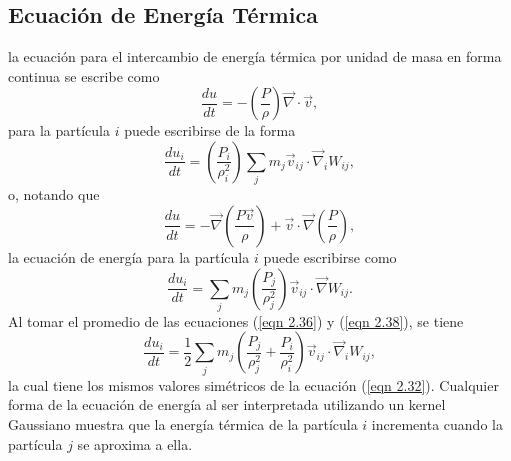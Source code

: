 \documentclass[a4paper,openright,12pt]{book}
\begin{document}
\subsection{Ecuación de Energía Térmica}
la ecuación para el intercambio de energía térmica por unidad de masa en forma continua se escribe como
\begin{equation}
\frac{d u}{d t}
=
-\left(\frac{P}{\rho}\right)
\vec{\nabla}\cdot\vec{v},\label{eqn 2.35}
\end{equation}
para la partícula $i$ puede escribirse de la forma
\begin{equation}
\frac{d u_{i}}{d t}
=
\left(\frac{P_{i}}{\rho_{i}^{2}}\right)
\sum_{j}m_{j}\vec{v}_{ij}\cdot\vec{\nabla}_{i}W_{ij},\label{eqn 2.36}
\end{equation}
o, notando que 
\begin{equation}
\frac{d u}{d t}
=
-\vec{\nabla}
\left(\frac{P\vec{v}}{\rho}\right)
+ 
\vec{v}\cdot\vec{\nabla}\left(\frac{P}{\rho}\right),\label{eqn 2.37}
\end{equation}
la ecuación de energía para la partícula $i$ puede escribirse como
\begin{equation}
\frac{d u_{i}}{d t}
=
\sum_{j}m_{j}\left(\frac{P_{j}}{\rho_{j}^{2}}\right)
\vec{v}_{ij}\cdot\vec{\nabla}W_{ij}.\label{eqn 2.38}
\end{equation}
Al tomar el promedio de las ecuaciones (\ref{eqn 2.36}) y (\ref{eqn 2.38}), se tiene
\begin{equation}
\frac{d u_{i}}{d t}
=
\frac{1}{2}\sum_{j}m_{j}\left(\frac{P_{j}}{\rho_{j}^{2}}
+\frac{P_{i}}{\rho_{i}^{2}}\right)
\vec{v}_{ij}\cdot\vec{\nabla}_{i}W_{ij},\label{eqn 2.39}
\end{equation}
la cual tiene los mismos valores simétricos de la ecuación (\ref{eqn 2.32}). Cualquier forma de la ecuación de energía al ser interpretada utilizando un kernel Gaussiano muestra que la energía térmica de la partícula $i$ incrementa cuando la partícula $j$ se aproxima a ella.
\end{document}

